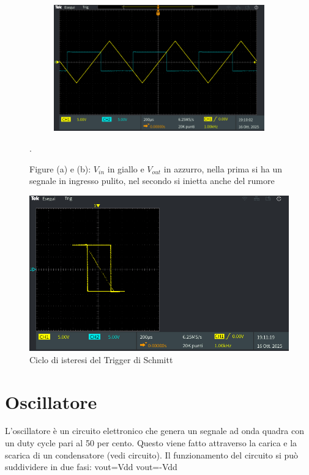 \documentclass[a4paper,12pt]{article}
\begin{document}
\begin{figure}
\begin{subfigure}{0.49\linewidth}
        \caption{}
    \end{subfigure}
    \begin{subfigure}{0.49\linewidth}
        \includegraphics[width = \linewidth]{immagini/schmitt/schmitt_vin_v+.png}
        \caption{}
    \end{subfigure}
    \caption{Figure (a) e (b): $V_{in}$ in giallo e $V_{out}$ in azzurro, nella prima si ha un segnale in ingresso pulito, nel secondo si inietta anche del rumore}. %
    \label{fig:schmitt_oscilloscopio}
\end{figure}

\begin{figure}
    \centering
    \includegraphics[width = 0.6\linewidth]{immagini/schmitt/schmitt_vin_vout_xy.png}
    \caption{Ciclo di isteresi del Trigger di Schmitt}
    \label{fig:schmitt_mod_xy}
\end{figure}


\section*{Oscillatore}
L'oscillatore è un circuito elettronico che genera un segnale ad onda quadra con un duty cycle pari al 50 per cento. Questo viene fatto attraverso la carica e la scarica di un condensatore (vedi circuito).
Il funzionamento del circuito si può suddividere in due fasi:
vout=Vdd
vout=-Vdd
\end{document}
